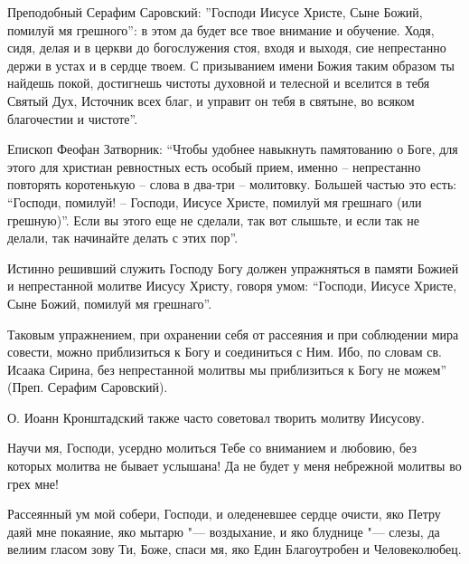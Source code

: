 Преподобный Серафим Саровский: ”Господи Иисусе Христе, Сыне Божий, помилуй мя грешного”:  в этом да будет все твое внимание и обучение. Ходя, сидя, делая и в церкви до богослужения стоя, входя и выходя, сие непрестанно держи в устах и в сердце твоем. С призыванием имени Божия таким образом ты найдешь покой, достигнешь чистоты духовной и телесной и вселится в тебя Святый Дух, Источник всех благ, и управит он тебя в святыне, во всяком благочестии и чистоте”. 

Епископ Феофан Затворник: “Чтобы удобнее навыкнуть памятованию о Боге, для этого для христиан ревностных есть особый прием, именно – непрестанно повторять коротенькую – слова в два-три – молитовку. Большей частью это есть: “Господи, помилуй! – Господи, Иисусе Христе, помилуй мя грешнаго (или грешную)”. Если вы этого еще не сделали, так вот слышьте, и если так не делали, так начинайте делать с этих пор”. 

Истинно решивший служить Господу Богу должен упражняться в памяти Божией и непрестанной молитве Иисусу Христу, говоря умом: “Господи, Иисусе Христе, Сыне Божий, помилуй мя грешнаго”. 

Таковым упражнением, при охранении себя от рассеяния и при соблюдении мира совести, можно приблизиться к Богу и соединиться с Ним. Ибо, по словам св. Исаака Сирина, без непрестанной молитвы мы приблизиться к Богу не можем” (Преп. Серафим Саровский). 

О. Иоанн Кронштадский также часто советовал творить молитву Иисусову.


\mychapterending

 





Научи мя, Господи, усердно молиться Тебе со вниманием и любовию, без которых молитва не бывает услышана! Да не будет у меня небрежной молитвы во грех мне!

 


\mychapterending

 





Рассеянный ум мой собери, Господи, и оледеневшее сердце очисти, яко Петру даяй мне покаяние, яко мытарю "--- воздыхание, и яко блуднице "--- слезы, да велиим гласом зову Ти, Боже, спаси мя, яко Един Благоутробен и Человеколюбец. 




